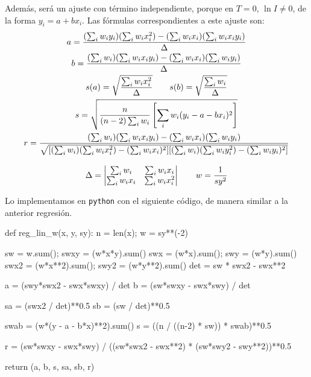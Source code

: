 \documentclass[12pt, a4paper, titlepage]{article}
\newcommand{\code}[1]{\texttt{#1}} %
\begin{document}
  Además, será un ajuste con término independiente, porque en $T=0$, $\ln{I} \ne 0$, de la forma $y_i = a + bx_i$. Las fórmulas correspondientes a este ajuste son:
  \begin{gather}
    a = \frac{(\sum_i{w_i y_i})(\sum_i{w_i x_i^2}) - (\sum_i{w_i x_i})(\sum_i{w_i x_i y_i})}{\Delta} \label{ec:regwa} \\
    b = \frac{(\sum_i{w_i})(\sum_i{w_i x_i y_i}) - (\sum_i{w_i x_i})(\sum_i{w_i y_i})}{\Delta} \label{ec:regwb} \\
    s(a) = \sqrt{\frac{\sum_i{w_i x_i^2}}{\Delta}} \qquad
    s(b) = \sqrt{\frac{\sum_i{w_i}}{\Delta}} \label{ec:regwsab} \\
    s = \sqrt{\frac{n}{(n - 2) \sum_i{w_i}} \left[ \sum_i{w_i(y_i - a - bx_i)^2} \right]} \label{ec:regws} \\ \vspace{0.3cm}
    r = \frac{(\sum_i{w_i})(\sum_i{w_i x_i y_i}) - (\sum_i{w_i x_i})(\sum_i{w_i y_i})}{\sqrt{[(\sum_i{w_i})(\sum_i{w_i x_i^2}) - (\sum_i{w_i x_i})^2] [(\sum_i{w_i})(\sum_i{w_i y_i^2}) - (\sum_i{w_i y_i})^2]}} \label{ec:regwr} \\
    \Delta = \begin{vmatrix}
              \sum_i{w_i} & \sum_i{w_i x_i} \\
              \sum_i{w_i x_i} & \sum_i{w_i x_i^2}
             \end{vmatrix} \qquad
    w = \frac{1}{sy^2}
  \end{gather}

  Lo implementamos en \code{python} con el siguiente código, de manera similar a la anterior regresión.

  \begin{python}
    def reg_lin_w(x, y, sy):
        n = len(x); w = sy**(-2)

        sw = w.sum(); swxy = (w*x*y).sum()
        swx = (w*x).sum(); swy = (w*y).sum()
        swx2 = (w*x**2).sum(); swy2 = (w*y**2).sum()
        det = sw * swx2 - swx**2

        a = (swy*swx2 - swx*swxy) / det
        b = (sw*swxy - swx*swy) / det

        sa = (swx2 / det)**0.5
        sb = (sw / det)**0.5

        swab = (w*(y - a - b*x)**2).sum()
        s = ((n / ((n-2) * sw)) * swab)**0.5

        r = (sw*swxy - swx*swy) / ((sw*swx2 - swx**2) * (sw*swy2 - swy**2))**0.5

        return (a, b, s, sa, sb, r)
  \end{python}
\end{document}
